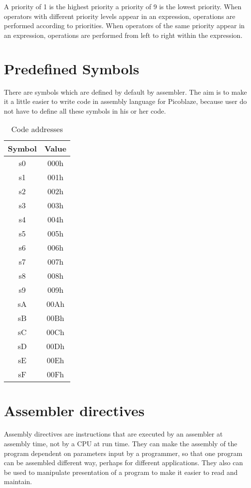     A priority of 1 is the highest priority a priority of 9 is the lowest priority. When operators with different priority levels appear in an expression, operations are performed according to priorities. When operators of the same priority appear in an expression, operations are performed from left to right within the expression.

\section{Predefined Symbols}
    There are symbols which are defined by default by assembler. The aim is to make it a little easier to write code in assembly language for Picoblaze, because user do not have to define all these symbols in his or her code.

    \begin{table}[h!]
        \centering{}
        \mysmallfont{}

        \begin{tabular}{|cc|}
            \hline
            Symbol & Value \\\hline
            s0     & 000h  \\\hline
            s1     & 001h  \\\hline
            s2     & 002h  \\\hline
            s3     & 003h  \\\hline
            s4     & 004h  \\\hline
            s5     & 005h  \\\hline
            s6     & 006h  \\\hline
            s7     & 007h  \\\hline
            s8     & 008h  \\\hline
            s9     & 009h  \\\hline
            sA     & 00Ah  \\\hline
            sB     & 00Bh  \\\hline
            sC     & 00Ch  \\\hline
            sD     & 00Dh  \\\hline
            sE     & 00Eh  \\\hline
            sF     & 00Fh  \\\hline
        \end{tabular}

        \caption{Code addresses}
    \end{table}

\section{Assembler directives}
    Assembly directives are instructions that are executed by an assembler at assembly time, not by a CPU at run time. They can make the assembly of the program dependent on parameters input by a programmer, so that one program can be assembled different way, perhaps for different applications. They also can be used to manipulate presentation of a program to make it easier to read and maintain.

